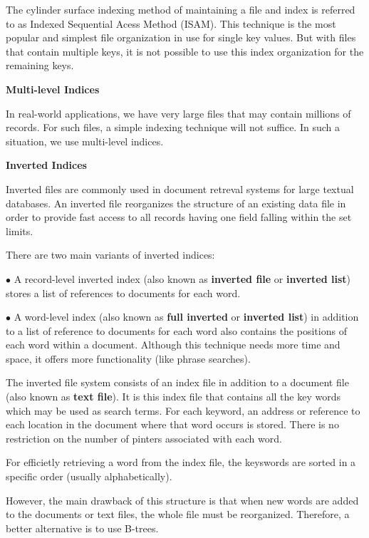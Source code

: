 \vskip 1mm
The cylinder surface indexing method of maintaining a file and index is referred to as Indexed Sequential Acess Method (ISAM). This technique is the most popular and simplest file organization in use for single key values. But with files that contain multiple keys, it is not possible to use this index organization for the remaining keys.

\filbreak
\vskip 1cm
{\bf Multi-level Indices}

\vskip 1mm
In real-world applications, we have very large files that may contain millions of records. For such files, a simple indexing technique will not suffice. In such a situation, we use multi-level indices.

\filbreak
\vskip 1cm
{\bf Inverted Indices}

\vskip 1mm
Inverted files are commonly used in document retreval systems for large textual databases. An inverted file reorganizes the structure of an existing data file in order to provide fast access to all records having one field falling within the set limits.

\vskip 1mm
There are two main variants of inverted indices:

\vskip 3mm
\qquad$\bullet$ A record-level inverted index (also known as {\bf inverted file} or {\bf inverted list}) stores a list of references to documents for each word.

\vskip 3mm
\qquad$\bullet$ A word-level index (also known as {\bf full inverted} or {\bf inverted list}) in addition to a list of reference to documents for each word also contains the positions of each word within a document. Although this technique needs more time and space, it offers more functionality (like phrase searches).

\vskip 1mm
The inverted file system consists of an index file in addition to a document file (also known as {\bf text file}). It is this index file that contains all the key words which may be used as search terms. For each keyword, an address or reference to each location in the document where that word occurs is stored. There is no restriction on the number of pinters associated with each word.

\vskip 1mm
For efficietly retrieving a word from the index file, the keyswords are sorted in a specific order (usually alphabetically).

\vskip 1mm
However, the main drawback of this structure is that when new words are added to the documents or text files, the whole file must be reorganized. Therefore, a better alternative is to use B-trees.

